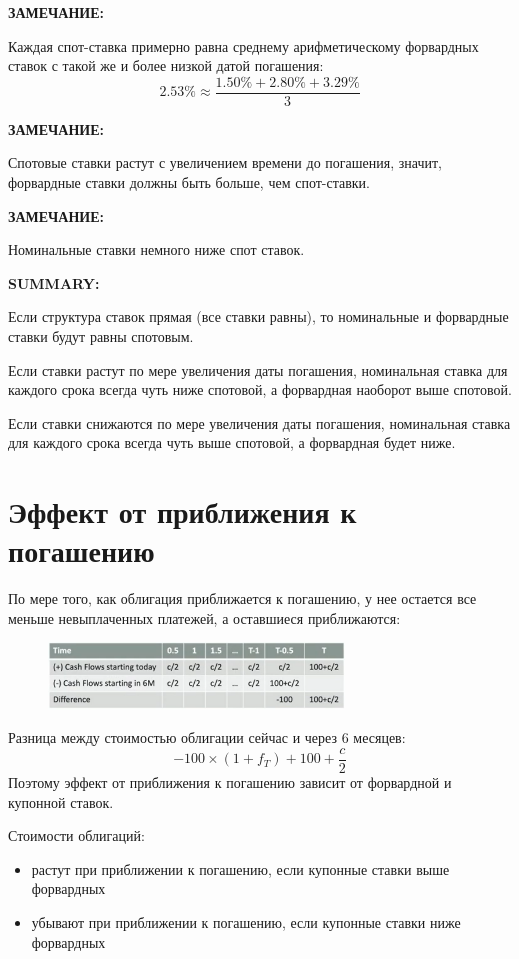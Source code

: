\documentclass{article}
\begin{document}
\textbf{ЗАМЕЧАНИЕ:}

Каждая спот-ставка примерно равна среднему арифметическому форвардных ставок с такой же и более низкой датой погашения:
\begin{equation*}
    2.53\% \approx \frac{1.50\% + 2.80\% + 3.29\%}{3}
\end{equation*}

\textbf{ЗАМЕЧАНИЕ:}

Спотовые ставки растут с увеличением времени до погашения, значит, форвардные ставки должны быть больше, чем спот-ставки.

\textbf{ЗАМЕЧАНИЕ:}

Номинальные ставки немного ниже спот ставок.

\textbf{SUMMARY:}

Если структура ставок прямая (все ставки равны), то номинальные и форвардные ставки будут равны спотовым.

Если ставки растут по мере увеличения даты погашения, номинальная ставка для каждого срока всегда чуть ниже спотовой, а форвардная наоборот выше спотовой.

Если ставки снижаются по мере увеличения даты погашения, номинальная ставка для каждого срока всегда чуть выше спотовой, а форвардная будет ниже.

\section{Эффект от приближения к погашению}

По мере того, как облигация приближается к погашению, у нее остается все меньше невыплаченных платежей, а оставшиеся приближаются:

\begin{figure}[h]
\centering
\includegraphics[width=0.7\textwidth]{6.png}
\label{loadings}
\end{figure}

Разница между стоимостью облигации сейчас и через 6 месяцев:
\begin{equation*}
    -100\times (1+f_T)+100+\frac{c}{2}
\end{equation*}
Поэтому эффект от приближения к погашению зависит от форвардной и купонной ставок.

Стоимости облигаций:
\begin{itemize}
    \item растут при приближении к погашению, если купонные ставки выше форвардных

    \item убывают при приближении к погашению, если купонные ставки ниже форвардных
\end{itemize}
\end{document}
